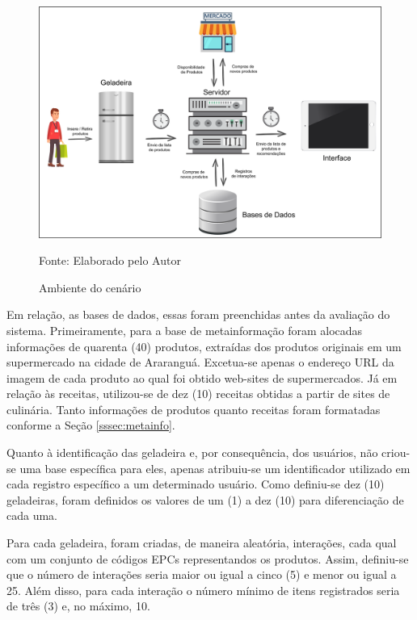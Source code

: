 \begin{figure}[htb]
    \caption{Ambiente do cenário}
    \label{fig:cap5_ambiente-cenario}
    \includegraphics[width=\textwidth]{figuras/cap5_cenario.png}
    
    \footnotesize{Fonte: Elaborado pelo Autor}
\end{figure}

Em relação, as bases de dados, essas foram preenchidas antes da avaliação do sistema. 
Primeiramente, para a base de metainformação foram alocadas informações de quarenta (40) produtos, extraídas dos produtos originais em um supermercado na cidade de Araranguá. Excetua-se apenas o endereço URL da imagem de cada produto ao qual foi obtido web-sites de supermercados. 
Já em relação às receitas, utilizou-se de dez (10) receitas obtidas a partir de sites de culinária. Tanto informações  de produtos quanto receitas foram formatadas conforme a Seção \ref{sssec:metainfo}.

Quanto à identificação das geladeira e, por consequência, dos usuários, não criou-se uma base específica para eles, apenas atribuiu-se um identificador utilizado em cada registro específico a um determinado usuário. Como definiu-se dez (10) geladeiras, foram definidos os valores de um (1) a dez (10) para diferenciação de cada uma.

Para cada geladeira, foram criadas, de maneira aleatória, interações, cada qual com um conjunto de códigos EPCs representandos os produtos. Assim, definiu-se que o número de interações seria maior ou igual a cinco (5) e menor ou igual a 25. Além disso, para cada interação o número mínimo de itens registrados seria de três (3) e, no máximo, 10.

